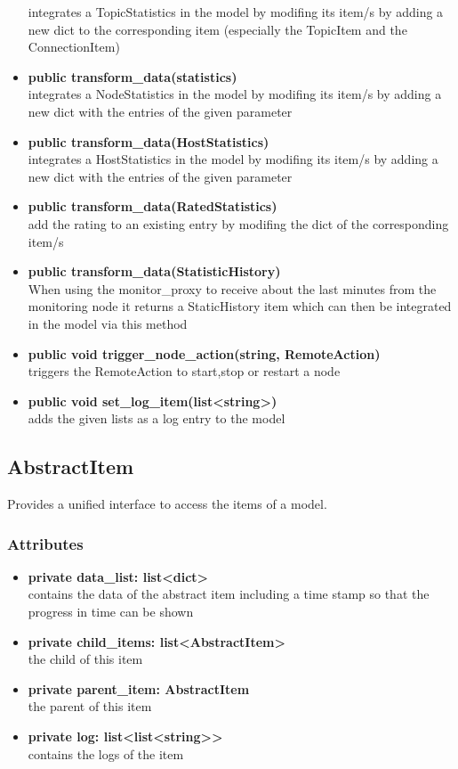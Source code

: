 \begin{itemize}
  integrates a TopicStatistics in the model by modifing its item/s by adding a new dict to the corresponding item (especially the TopicItem and the ConnectionItem)
  \item \textbf{public transform\_data(statistics)}\\ 
  integrates a NodeStatistics in the model by modifing its item/s by adding a new dict with the entries of the given parameter
  \item \textbf{public transform\_data(HostStatistics)}\\ 
  integrates a HostStatistics in the model by modifing its item/s by adding a new dict with the entries of the given parameter
  \item \textbf{public transform\_data(RatedStatistics)}\\ 
  add the rating to an existing entry by modifing the dict of the corresponding
  item/s
  \item \textbf{public transform\_data(StatisticHistory)}\\ 
  When using the monitor\_proxy to receive about the last minutes from the monitoring node
  it returns a StaticHistory item which can then be integrated in the model via this method
  \item \textbf{public void trigger\_node\_action(string, RemoteAction)}\\
  triggers the RemoteAction to start,stop or restart a node
  \item\textbf{public void set\_log\_item(list<string>)}\\
  adds the given lists as a log entry to the model
  \end{itemize}

\subsection{AbstractItem}
Provides a unified interface to access the items of a model.
\subsubsection{Attributes}
\begin{itemize}
  \item \textbf{private data\_list: list<dict>}\\ 
  contains the data of the abstract item including a time stamp so that
  the progress in time can be shown
  \item \textbf{private child\_items: list<AbstractItem>}\\ 
  the child of this item
  \item \textbf{private parent\_item: AbstractItem}\\ 
  the parent of this item
  \item \textbf{private log: list<list<string>>}\\
  contains the logs of the item
\end{itemize}
